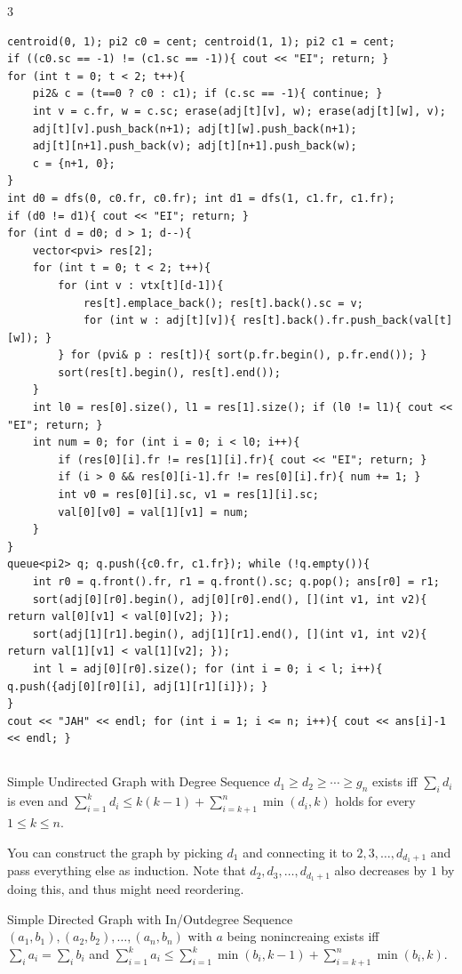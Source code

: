 \documentclass[landscape, 8pt, a4paper, oneside]{extarticle}
\begin{document}
\begin{multicols*}{3}
\begin{verbatim}
centroid(0, 1); pi2 c0 = cent; centroid(1, 1); pi2 c1 = cent;
if ((c0.sc == -1) != (c1.sc == -1)){ cout << "EI"; return; }
for (int t = 0; t < 2; t++){
	pi2& c = (t==0 ? c0 : c1); if (c.sc == -1){ continue; }
	int v = c.fr, w = c.sc; erase(adj[t][v], w); erase(adj[t][w], v);
	adj[t][v].push_back(n+1); adj[t][w].push_back(n+1);
	adj[t][n+1].push_back(v); adj[t][n+1].push_back(w);
	c = {n+1, 0};
}
int d0 = dfs(0, c0.fr, c0.fr); int d1 = dfs(1, c1.fr, c1.fr);
if (d0 != d1){ cout << "EI"; return; }
for (int d = d0; d > 1; d--){
	vector<pvi> res[2];
	for (int t = 0; t < 2; t++){
		for (int v : vtx[t][d-1]){
			res[t].emplace_back(); res[t].back().sc = v;
			for (int w : adj[t][v]){ res[t].back().fr.push_back(val[t][w]); }
		} for (pvi& p : res[t]){ sort(p.fr.begin(), p.fr.end()); }
		sort(res[t].begin(), res[t].end());
	}
	int l0 = res[0].size(), l1 = res[1].size(); if (l0 != l1){ cout << "EI"; return; }
	int num = 0; for (int i = 0; i < l0; i++){
		if (res[0][i].fr != res[1][i].fr){ cout << "EI"; return; }
		if (i > 0 && res[0][i-1].fr != res[0][i].fr){ num += 1; }
		int v0 = res[0][i].sc, v1 = res[1][i].sc;
		val[0][v0] = val[1][v1] = num;
	}
}
queue<pi2> q; q.push({c0.fr, c1.fr}); while (!q.empty()){
	int r0 = q.front().fr, r1 = q.front().sc; q.pop(); ans[r0] = r1;
	sort(adj[0][r0].begin(), adj[0][r0].end(), [](int v1, int v2){ return val[0][v1] < val[0][v2]; });
	sort(adj[1][r1].begin(), adj[1][r1].end(), [](int v1, int v2){ return val[1][v1] < val[1][v2]; });
	int l = adj[0][r0].size(); for (int i = 0; i < l; i++){ q.push({adj[0][r0][i], adj[1][r1][i]}); }
}
cout << "JAH" << endl; for (int i = 1; i <= n; i++){ cout << ans[i]-1 << endl; }
\end{verbatim}
\subsection{}
Simple Undirected Graph with Degree Sequence $d_1 \ge d_2 \ge \cdots \ge g_n$ exists iff $\sum_i d_i$ is even and $\sum_{i=1}^{k} d_i \le k(k-1) + \sum_{i=k+1}^{n} \min(d_i, k)$ holds for every $1 \le k \le n$.

You can construct the graph by picking $d_1$ and connecting it to $2, 3, \ldots, d_{d_1+1}$ and pass everything else as induction. Note that $d_2, d_3, \ldots, d_{d_1+1}$ also decreases by $1$ by doing this, and thus might need reordering.

Simple Directed Graph with In/Outdegree Sequence $(a_1, b_1), (a_2, b_2), \ldots, (a_n, b_n)$ with $a$ being nonincreaing exists iff $\sum_i a_i = \sum_i b_i$ and $\sum_{i=1}^{k} a_i \le \sum_{i=1}^{k} \min(b_i, k-1) + \sum_{i=k+1}^{n} \min(b_i, k)$.


\end{multicols*}
\end{document}
